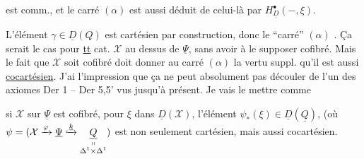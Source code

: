 est comm., et le carré $(\alpha)$ est aussi déduit de
celui-là par $H^\bullet_{\underline D}(-,\xi)$.

L'élément $\gamma\in\underline D(Q)$ est cartésien par construction, donc le ``carré'' $(\alpha)$ . Ça serait le cas pour \uline{tt} cat. $\mathcal X$  au dessus de $\underline\Psi$, sans avoir à le supposer cofibré. Mais le fait que $\mathcal X$ soit cofibré doit donner au carré $(\alpha)$ la vertu suppl. qu'il est aussi \uline{cocartésien}. J'ai l'impression que ça ne peut absolument pas découler de l'un des axiomes Der 1 -- Der 5,5' vus jusqu'à présent. Je vais le mettre comme

   si $\mathcal X$ sur $\underline\Psi$ est cofibré, pour $\xi$    dans $\underline D(\mathcal X)$,  l'élément $\psi_*(\xi)\in\underline D(\underline Q)$, (où $\psi=(\mathcal X\xrightarrow{\varphi}\underline\Psi\lhook\joinrel\xrightarrow{\underline k}\underset{\substack{\shortparallel\\\Delta^1\times\Delta^1}}{\underline Q})$ est non seulement cartésien, mais aussi cocartésien.


